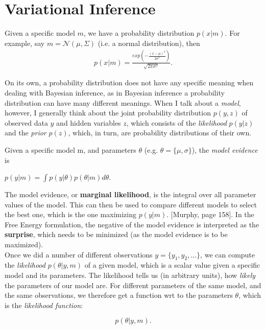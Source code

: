 \section{Variational Inference}

Given a specific model $m$, we have a probability distribution $p(x|m)$. For example, say $m = \mathcal{N}(\mu,\Sigma)$ (i.e. a normal distribution), then \\

\begin{align*}
p(x|m) = \frac{exp(-\frac{(x-\mu)^2}{2\sigma^2})}{\sqrt{2\pi \sigma^2}}.
\end{align*}

On its own, a probability distribution does not have any specific meaning when dealing with Bayesian inference, as in Bayesian inference a probability distribution can have many different meanings. When I talk about a \textit{model}, however, I generally think about the joint probability distribution $p(y,z)$ of observed data $y$ and hidden variables $z$, which consists of the \textit{likelihood} $p(y|z)$ and the \textit{prior} $p(z)$, which, in turn, are probability distributions of their own.

\noindent Given a specific model m, and parameters $\theta$ (e.g. $\theta = \{\mu, \sigma\}$), the \textit{model evidence} is 

$p(y|m) = \int p(y|\theta)p(\theta|m)d\theta$. 

\noindent The model evidence, or \textbf{marginal likelihood}, is the integral over all parameter values of the model. This can then be used to compare different models to select the best one, which is the one maximizing $p(y|m)$. [Murphy, page 158].  In the Free Energy formulation, the negative of the model evidence is interpreted as the \textbf{surprise}, which needs to be minimized (as the model evidence is to be maximized).\\

\noindent Once we did a number of different observations $y = \{y_1, y_2, ...\}$, we can compute the \textit{likelihood} $p(\theta|y,m)$ of a given model, which is a scalar value given a specific model and its parameters. The likelihood tells us (in arbitrary units), how \textit{likely} the parameters of our model are. For different parameters of the same model, and the same observations, we therefore get a function wrt to the parameters $\theta$, which is the \textit{likelihood function}:

\begin{equation}
p(\theta | y,m).
\end{equation}

